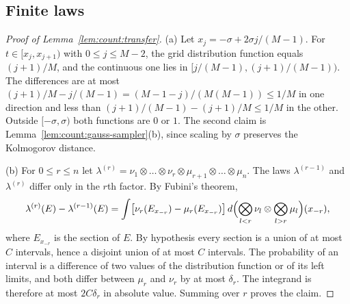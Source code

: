 \subsection{Finite laws}

\begin{proof}[Proof of Lemma~\ref{lem:count:transfer}]
(a) Let $x_j=-\sigma+2\sigma j/(M-1)$. For $t\in[x_j,x_{j+1})$ with
$0\le j\le M-2$, the grid distribution function equals $(j+1)/M$, and the
continuous one lies in $[j/(M-1),(j+1)/(M-1))$. The differences are at most
$(j+1)/M-j/(M-1)=(M-1-j)/(M(M-1))\le1/M$ in one direction and less than
$(j+1)/(M-1)-(j+1)/M\le1/M$ in the other. Outside $[-\sigma,\sigma)$ both
functions are $0$ or $1$. The second claim is
Lemma~\ref{lem:count:gauss-sampler}(b), since scaling by $\sigma$ preserves the
Kolmogorov distance.

(b) For $0\le r\le n$ let
$\lambda^{(r)}=\nu_1\otimes\dots\otimes\nu_r\otimes\mu_{r+1}\otimes\dots\otimes\mu_n$.
The laws $\lambda^{(r-1)}$ and $\lambda^{(r)}$ differ only in the $r$th
factor. By Fubini's theorem,
\[
 \lambda^{(r)}(E)-\lambda^{(r-1)}(E)
 =\int\bigl[\nu_r(E_{x_{-r}})-\mu_r(E_{x_{-r}})\bigr]\,
 d\Bigl(\bigotimes_{l<r}\nu_l\otimes\bigotimes_{l>r}\mu_l\Bigr)(x_{-r}),
\]
where $E_{x_{-r}}$ is the section of $E$. By hypothesis every section is a
union of at most $C$ intervals, hence a disjoint union of at most $C$
intervals. The probability of an interval is a difference of two values of
the distribution function or of its left limits, and both differ between
$\mu_r$ and $\nu_r$ by at most $\delta_r$. The integrand is therefore at most
$2C\delta_r$ in absolute value. Summing over $r$ proves the claim.
\end{proof}

